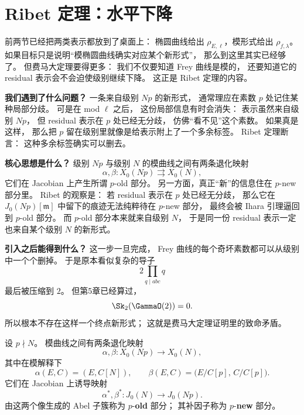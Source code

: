 \section{Ribet 定理：水平下降}
\label{sec:ch09-ribet}

\providecommand{\Zl}{\mathbb{Z}_\ell}
\providecommand{\Ql}{\mathbb{Q}_\ell}
\providecommand{\rhobar}{\bar{\rho}}

前两节已经把两类表示都放到了桌面上：
椭圆曲线给出 $\rho_{E,\ell}$，模形式给出 $\rho_{f,\lambda}$。
如果目标只是说明“模椭圆曲线确实对应某个新形式”，
那么到这里其实已经够了。
但费马大定理要得更多：
我们不仅要知道 Frey 曲线是模的，
还要知道它的 residual 表示会不会迫使级别继续下降。
这正是 Ribet 定理的内容。

\textbf{我们遇到了什么问题？}
一条来自级别 $Np$ 的新形式，
通常理应在素数 $p$ 处记住某种局部分歧。
可是在 mod $\ell$ 之后，
这份局部信息有时会消失：
表示虽然来自级别 $Np$，
但 residual 表示在 $p$ 处已经无分歧，
仿佛“看不见”这个素数。
如果真是这样，
那么把 $p$ 留在级别里就像是给表示附上了一个多余标签。
Ribet 定理断言：
这种多余标签确实可以删去。

\textbf{核心思想是什么？}
级别 $Np$ 与级别 $N$ 的模曲线之间有两条退化映射
\[
  \alpha,\beta\colon X_0(Np)\rightrightarrows X_0(N),
\]
它们在 Jacobian 上产生所谓 $p$-old 部分。
另一方面，真正“新”的信息住在 $p$-new 部分里。
Ribet 的观察是：
若 residual 表示在 $p$ 处已经无分歧，
那么它在 $J_0(Np)[\mathfrak m]$ 中留下的痕迹无法纯粹待在 $p$-new 部分，
最终会被 Ihara 引理逼回到 $p$-old 部分。
而 $p$-old 部分本来就来自级别 $N$，
于是同一份 residual 表示一定也来自某个级别 $N$ 的新形式。

\textbf{引入之后能得到什么？}
这一步一旦完成，
Frey 曲线的每个奇坏素数都可以从级别中一个个删掉。
于是原本看似复杂的导子
\[
  2\prod_{q\mid abc}q
\]
最后被压缩到 $2$。
但第5章已经算过，
\[
  \Sk_2(\GammaO(2))=0.
\]
所以根本不存在这样一个终点新形式；
这就是费马大定理证明里的致命矛盾。



\begin{definition}
设 $p\nmid N$。
模曲线之间有两条退化映射
\[
  \alpha,\beta\colon X_0(Np)\to X_0(N),
\]
其中在模解释下
\[
  \alpha(E,C)=(E,C[N]),
  \qquad
  \beta(E,C)=\bigl(E/C[p],\,C/C[p]\bigr).
\]
它们在 Jacobian 上诱导映射
\[
  \alpha^*,\beta^*\colon J_0(N)\to J_0(Np).
\]
由这两个像生成的 Abel 子簇称为 $p$-\textbf{old} 部分；
其补因子称为 $p$-\textbf{new} 部分。
\end{definition}

